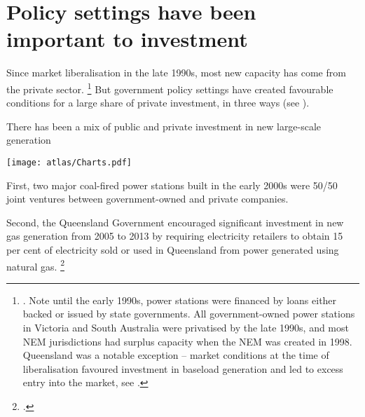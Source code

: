 \documentclass[FrontPage]{grattan}
\begin{document}
\section{Policy settings have been important to investment}\label{sec:government-policy-settings-important-to-investment}

Since market liberalisation in the late 1990s, most new capacity has come from the private sector.%
\footnote{\textcite{Simshauser2009ToxicDebt}. Note until the early 1990s, power stations were financed by loans either backed or issued by state governments. All government-owned power stations in Victoria and South Australia were privatised by the late 1990s, and most NEM jurisdictions had surplus capacity when the NEM was created in 1998. Queensland was a notable exception -- market conditions at the time of liberalisation favoured investment in baseload generation and led to excess entry into the market, see \textcite{Simshauser2006StructuralFaultsEOM}.}
But government policy settings have created favourable conditions for a large share of private investment, in three ways (see ).

\begin{figureTop}
\caption{There has been a mix of public and private investment in new large-scale generation}\label{fig:public-private-investment-in-generation}
\texttt{[image: atlas/Charts.pdf]}
\end{figureTop}

First, two major coal-fired power stations built in the early 2000s were 50/50 joint ventures between government-owned and private companies.

Second, the Queensland Government encouraged significant investment in new gas generation from 2005 to 2013 by requiring electricity retailers to obtain 15 per cent of electricity sold or used in Queensland from power generated using natural gas.%
\footcite{Gibson2013QLDGasScheme}
\end{document}
